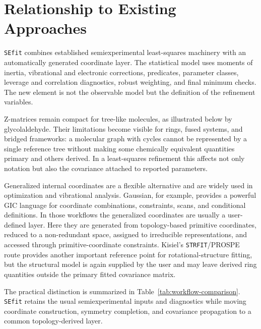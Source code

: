 \documentclass[journal=jctcce,manuscript=article,maxauthors=999]{achemso}
\begin{document}
\section{Relationship to Existing Approaches}

\texttt{SEfit} combines established semiexperimental least-squares
machinery\cite{Mendolicchio2017MSR,Bartell1975Predicate,Mendolicchio2025FastDvib}
with an automatically generated coordinate layer. The statistical model uses
moments of inertia, vibrational and electronic corrections, predicates,
parameter classes, leverage and correlation diagnostics, robust weighting, and
final minimum checks. The new element is not the observable model but the
definition of the refinement variables.

Z-matrices remain compact for tree-like molecules, as illustrated below by
glycolaldehyde. Their limitations become visible for rings, fused systems, and
bridged frameworks: a molecular graph with cycles cannot be represented by a
single reference tree without making some chemically equivalent quantities
primary and others derived. In a least-squares refinement this affects not
only notation but also the covariance attached to reported parameters.

Generalized internal coordinates are a flexible alternative and are widely
used in optimization and vibrational analysis.\cite{Wilson1955,PulayFogarasi1992,Peng1996Redundant,Baker1996Delocalized,BakkenHelgaker2002,Marenich2025GIC}
Gaussian, for example, provides a powerful GIC language for coordinate
combinations, constraints, scans, and conditional definitions.\cite{Peng1996Redundant,Marenich2025GIC}
In those workflows the generalized coordinates are usually a user-defined
layer. Here they are generated from topology-based primitive coordinates,
reduced to a non-redundant space, assigned to irreducible representations, and
accessed through primitive-coordinate constraints. Kisiel's
\texttt{STRFIT}/PROSPE route\cite{KisielPROSPE} provides another important
reference point for rotational-structure fitting, but the structural model is
again supplied by the user and may leave derived ring quantities outside the
primary fitted covariance matrix.\cite{Kanzow2025PCCP}

The practical distinction is summarized in Table~\ref{tab:workflow-comparison}.
\texttt{SEfit} retains the usual semiexperimental inputs and diagnostics while
moving coordinate construction, symmetry completion, and covariance propagation
to a common topology-derived layer.
\end{document}
